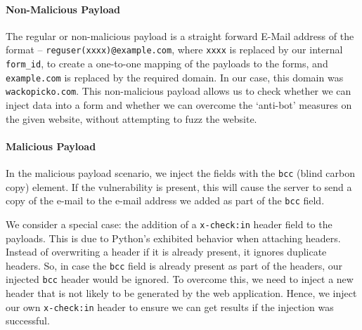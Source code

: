 \paragraph{Non-Malicious Payload}
\label{Comp:Fuzzer:nmp}
The regular or non-malicious payload is a straight forward E-Mail address of the format -- \texttt{reguser(xxxx)@example.com}, where \texttt{xxxx} is replaced by our internal \texttt{form\_id}, to create a one-to-one mapping of the payloads to the forms, and \texttt{example.com} is replaced by the required domain. In our case, this domain was \texttt{wackopicko.com}.
This non-malicious payload allows us to check whether we can inject data into a form and whether we can overcome the `anti-bot' measures on the given website, without attempting to fuzz the website. 

\paragraph{Malicious Payload}
\label{Comp:Fuzzer:mp}
In the malicious payload scenario, we inject the fields with the \texttt{bcc} (blind carbon copy) element. If the vulnerability is present, this will cause the server to send a copy of the e-mail to the e-mail address we added as part of the \texttt{bcc} field.

We consider a special case: the addition of a \texttt{x-check:in} header field to the payloads. This is due to Python's exhibited behavior when attaching
headers. Instead of overwriting a header if it is already present, it ignores duplicate headers. So, in case the \texttt{bcc} field is already present as part of the headers, our injected \texttt{bcc} header would be ignored. To overcome this, we need to inject a new header that is not likely to be generated by the web application. Hence, we inject our own \texttt{x-check:in} header to ensure we can get results if the injection was successful.

